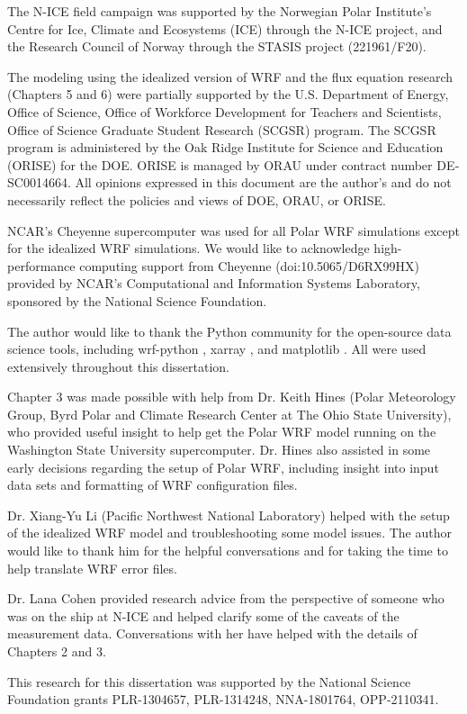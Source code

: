 The N-ICE field campaign was supported by the Norwegian Polar Institute's Centre for Ice, Climate and Ecosystems (ICE) through the N-ICE project, and the Research Council of Norway through the STASIS project (221961/F20). 

The modeling using the idealized version of WRF and the flux equation research (Chapters 5 and 6) were partially supported by the U.S. Department of Energy, Office of Science, Office of Workforce Development for Teachers and Scientists, Office of Science Graduate Student Research (SCGSR) program. The SCGSR program is administered by the Oak Ridge Institute for Science and Education (ORISE) for the DOE. ORISE is managed by ORAU under contract number DE‐SC0014664. All opinions expressed in this document are the author’s and do not necessarily reflect the policies and views of DOE, ORAU, or ORISE.

NCAR's Cheyenne supercomputer was used for all Polar WRF simulations except for the idealized WRF simulations. We would like to acknowledge high-performance computing support from Cheyenne (doi:10.5065/D6RX99HX) provided by NCAR's Computational and Information Systems Laboratory, sponsored by the National Science Foundation.

The author would like to thank the Python community for the open-source data science tools, including wrf-python \citep{wrfpython}, xarray \citep{xarray}, and matplotlib \citep{matplotlib}. All were used extensively throughout this dissertation. 

Chapter 3 was made possible with help from Dr. Keith Hines (Polar Meteorology Group, Byrd Polar and Climate Research Center at The Ohio State University), who provided useful insight to help get the Polar WRF model running on the Washington State University supercomputer. Dr. Hines also assisted in some early decisions regarding the setup of Polar WRF, including insight into input data sets and formatting of WRF configuration files.

Dr. Xiang-Yu Li (Pacific Northwest National Laboratory) helped with the setup of the idealized WRF model and troubleshooting some model issues. The author would like to thank him for the helpful conversations and for taking the time to help translate WRF error files.

Dr. Lana Cohen provided research advice from the perspective of someone who was on the ship at N-ICE and helped clarify some of the caveats of the measurement data. Conversations with her have helped with the details of Chapters 2 and 3. 

This research for this dissertation was supported by the National Science Foundation grants PLR-1304657, PLR-1314248, NNA-1801764, OPP-2110341.